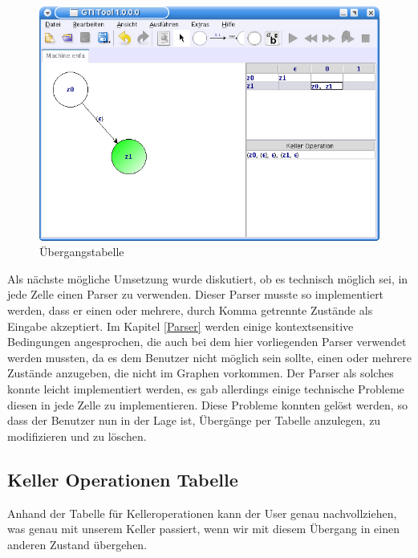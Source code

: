 \begin{figure}[h!]
\begin{center}
\includegraphics[width=12cm]{../images/machine_table.png}
\caption{Übergangstabelle}
\end{center}
\end{figure}
\vspace{10pt}

Als nächste mögliche Umsetzung wurde diskutiert, ob es technisch möglich sei,
in jede Zelle einen Parser zu verwenden. Dieser Parser musste so implementiert
werden, dass er einen oder mehrere, durch Komma getrennte Zustände als Eingabe
akzeptiert. Im Kapitel \ref{Parser} werden einige kontextsensitive Bedingungen
angesprochen, die auch bei dem hier vorliegenden Parser verwendet werden
mussten, da es dem Benutzer nicht möglich sein sollte, einen oder mehrere
Zustände anzugeben, die nicht im Graphen vorkommen. Der Parser als solches
konnte leicht implementiert werden, es gab allerdings einige technische
Probleme diesen in jede Zelle zu implementieren. Diese Probleme konnten gelöst
werden, so dass der Benutzer nun in der Lage ist, Übergänge per Tabelle
anzulegen, zu modifizieren und zu löschen.\vspace{10pt}


\subsection{Keller Operationen Tabelle}

Anhand der Tabelle für Kelleroperationen kann der User genau nachvollziehen,
was genau mit unserem Keller passiert, wenn wir mit diesem
Übergang in einen anderen Zustand übergehen.\vspace{10pt}

